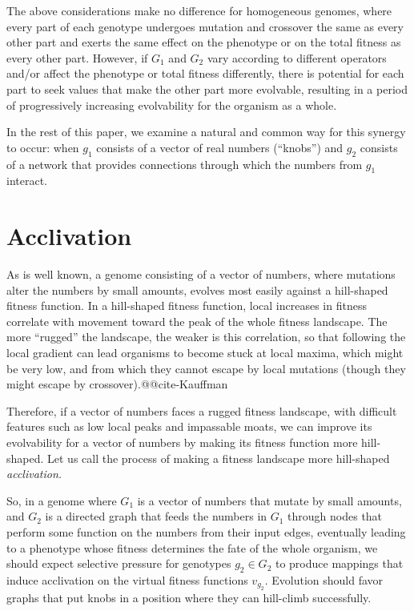 \documentclass[letterpaper]{article}
\begin{document}
The above considerations make no difference for homogeneous genomes, where
every part of each genotype undergoes mutation and crossover the same as every
other part and exerts the same effect on the phenotype or on the total fitness
as every other part. However, if $G_1$ and $G_2$ vary according to different
operators and/or affect the phenotype or total fitness differently, there is
potential for each part to seek values that make the other part more
evolvable, resulting in a period of progressively increasing evolvability for
the organism as a whole.

In the rest of this paper, we examine a natural and common way for this
synergy to occur: when $g_1$ consists of a vector of real numbers (``knobs'')
and $g_2$ consists of a network that provides connections through which the
numbers from $g_1$ interact.

\section{Acclivation}

As is well known, a genome consisting of a vector of numbers, where mutations
alter the numbers by small amounts, evolves most easily against a hill-shaped
fitness function. In a hill-shaped fitness function, local increases in
fitness correlate with movement toward the peak of the whole fitness
landscape. The more ``rugged'' the landscape, the weaker is this correlation,
so that following the local gradient can lead organisms to become stuck at
local maxima, which might be very low, and from which they cannot escape by
local mutations (though they might escape by crossover).@@cite-Kauffman

Therefore, if a vector of numbers faces a rugged fitness landscape, with
difficult features such as low local peaks and impassable moats, we can
improve its evolvability for a vector of numbers by making its fitness
function more hill-shaped. Let us call the process of making a fitness
landscape more hill-shaped \textit{acclivation.}

So, in a genome where $G_1$ is a vector of numbers that mutate by small
amounts, and $G_2$ is a directed graph that feeds the numbers in $G_1$ through
nodes that perform some function on the numbers from their input edges,
eventually leading to a phenotype whose fitness determines the fate of the
whole organism, we should expect selective pressure for genotypes $g_2 \in
G_2$ to produce mappings that induce acclivation on the virtual fitness
functions $v_{g_2}$. Evolution should favor graphs that put knobs in a
position where they can hill-climb successfully.
\end{document}
